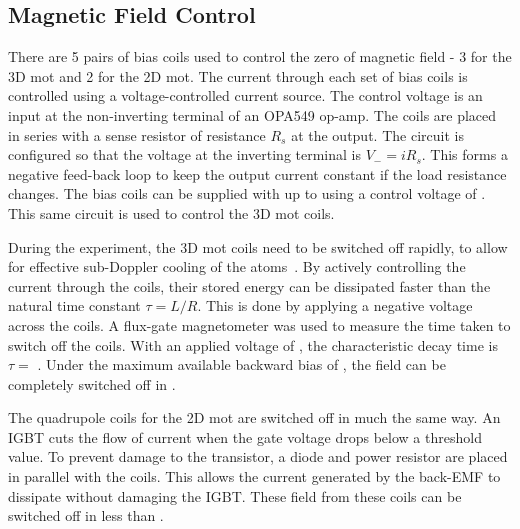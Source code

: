 \subsection{Magnetic Field Control}\label{subsec:coil_control} 
There are 5 pairs of bias coils used to control the zero of magnetic
field - 3 for the 3D \ac{mot} and 2 for the 2D \ac{mot}. 
The current through each set of
bias coils is
controlled using a voltage-controlled current source. The control
voltage is an input at the non-inverting terminal of an OPA549 op-amp.
The coils are placed in series with a sense resistor of resistance
\(R_s\) at the output. The circuit is configured so that the voltage
at the inverting terminal is \(V_- = i R_s\).  This forms a negative
feed-back loop to keep the output current constant if the load
resistance changes. The bias coils can be supplied with up to
 using a control voltage of . This same circuit is used to control the 3D \ac{mot}
coils.
\par \noindent
During the experiment, the 3D \ac{mot} coils need to be
switched off rapidly, to allow for effective sub-Doppler cooling of
the atoms~\cite{Dedman2001}. By actively controlling the current
through the coils, their stored energy can be dissipated faster than
the natural time constant \(\tau = L/R\). This is done by applying a
negative voltage across the coils. A flux-gate magnetometer
was used to measure the time taken to switch off the coils. With an
applied voltage of , the characteristic decay time
is \(\tau = \) . Under the maximum
available backward bias of , the field can be
completely switched off in . \par\noindent
The quadrupole coils for the 2D \ac{mot} are switched off in much the
same way. An IGBT cuts the flow of current when the gate voltage drops
below a threshold value. To prevent damage to the transistor, a diode
and  power resistor are placed in parallel with the
coils. This allows the current generated by the back-EMF to dissipate
without damaging the IGBT. These field from these coils can be
switched off in less than .


